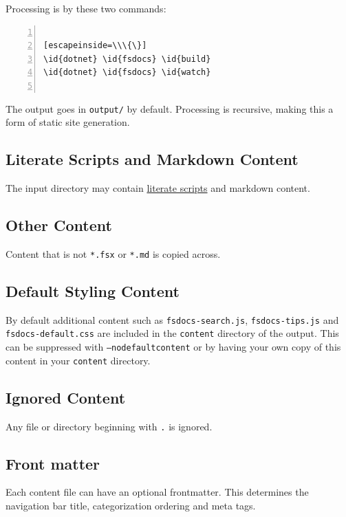 \documentclass{article}
\newcommand{\id}[1]{\textcolor{black}{#1}}
\begin{document}
Processing is by these two commands:
\begin{lstlisting}[numbers=left]

[escapeinside=\\\{\}]
\id{dotnet} \id{fsdocs} \id{build}
\id{dotnet} \id{fsdocs} \id{watch}


\end{lstlisting}



The output goes in \texttt{output/} by default.  Processing is recursive, making this a form of static site generation.
\subsection*{Literate Scripts and Markdown Content}



The input directory may contain \href{literate.html}{literate scripts} and markdown content.
\subsection*{Other Content}



Content that is not \texttt{*.fsx} or \texttt{*.md} is copied across.
\subsection*{Default Styling Content}



By default additional content such as \texttt{fsdocs-search.js}, \texttt{fsdocs-tips.js} and \texttt{fsdocs-default.css} are included in
the \texttt{content} directory of the output.  This can be suppressed with \texttt{--nodefaultcontent} or by having your own
copy of this content in your \texttt{content} directory.
\subsection*{Ignored Content}



Any file or directory beginning with \texttt{.} is ignored.
\subsection*{Front matter}



Each content file can have an optional frontmatter.  This determines the navigation bar title, categorization ordering and meta tags.
\end{document}

